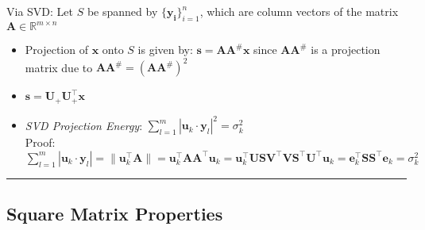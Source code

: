 Via SVD: Let $S$ be spanned by $\{\boldsymbol{y_i}\}_{i=1}^n$, which are column vectors of the matrix $\boldsymbol{A} \in \mathbb{R}^{m \times n}$
\begin{itemize}
    \item Projection of $\boldsymbol{x}$ onto $S$ is given by: $\boldsymbol{s} = \boldsymbol{A}\boldsymbol{A}^{\#}\boldsymbol{x}$ since $\boldsymbol{A}\boldsymbol{A}^{\#}$ is a projection matrix due to $\boldsymbol{A}\boldsymbol{A}^{\#} = (\boldsymbol{A}\boldsymbol{A}^{\#})^2$
    \item $\boldsymbol{s} = \boldsymbol{U}_{+} \boldsymbol{U}_{+}^\intercal \boldsymbol{x}$ 
    \item \emph{SVD Projection Energy}: $\sum_{l=1}^m | \boldsymbol{u}_k \cdot \boldsymbol{y}_l |^2 = \sigma_k^2$\\
    Proof:
    $\sum_{l=1}^m | \boldsymbol{u}_k \cdot \boldsymbol{y}_l |= \| \boldsymbol{u}_k^\intercal \boldsymbol{A} \| = \boldsymbol{u}_k^\intercal \boldsymbol{A} \boldsymbol{A}^\intercal \boldsymbol{u}_k = \boldsymbol{u}_k^\intercal \boldsymbol{U} \boldsymbol{S} \boldsymbol{V}^\intercal \boldsymbol{V} \boldsymbol{S}^\intercal \boldsymbol{U}^\intercal \boldsymbol{u}_k = \boldsymbol{e}_k^\intercal  \boldsymbol{S}  \boldsymbol{S}^\intercal \boldsymbol{e}_k = \sigma_k^2$
\end{itemize}

{\color{black}\hrule height 0.001mm}

\subsection*{Square Matrix Properties}

